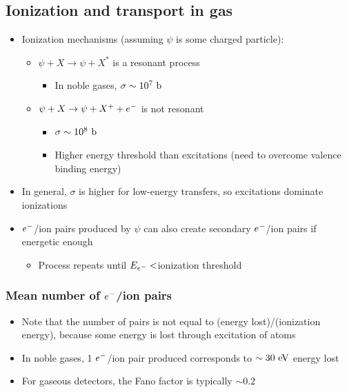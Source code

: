 \subsection{Ionization and transport in gas}
\begin{itemize}
  \item Ionization mechanisms (assuming $\psi$ is some charged particle):
  \begin{itemize}
    \item $\psi+X\rightarrow\psi+X^*$ is a resonant process
    \begin{itemize}
      \item In noble gases, $\sigma\sim 10^7~\text{b}$
    \end{itemize}
    \item $\psi+X \rightarrow \psi+X^++e^{-}$ is not resonant
    \begin{itemize}
      \item $\sigma\sim 10^8~\text{b}$
      \item Higher energy threshold than excitations (need to overcome valence binding energy)
    \end{itemize}
  \end{itemize}
  \item In general, $\sigma$ is higher for low-energy transfers, so excitations dominate ionizations
  \item $e^{-}$/ion pairs produced by $\psi$ can also create secondary $e^{-}$/ion pairs if energetic enough
  \begin{itemize}
    \item Process repeats until $E_{e^{-}}<$ionization threshold
  \end{itemize}
\end{itemize}
\subsubsection{Mean number of $e^{-}$/ion pairs}
\begin{itemize}
  \item Note that the number of pairs is not equal to (energy lost)/(ionization energy), because some energy is lost through excitation of atoms
  \item In noble gases, 1 $e^{-}$/ion pair produced corresponds to $\sim30~\text{eV}$ energy lost
  \item For gaseous detectors, the Fano factor is typically $\sim 0.2$
\end{itemize}
